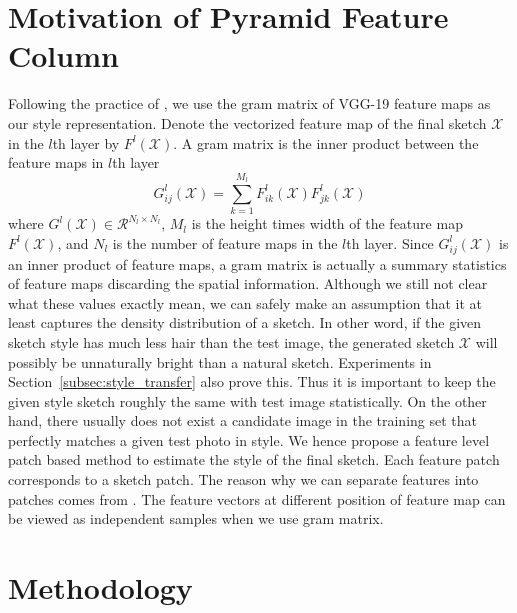 \documentclass[10pt,twocolumn,letterpaper]{article}
\begin{document}
\section{Motivation of Pyramid Feature Column}\label{sec:motivation}

Following the practice of \cite{gatys2015neural}, we use the gram matrix of VGG-19\cite{simonyan2014very} feature maps as our style representation. Denote the vectorized feature map of the final sketch $\mathcal{X}$ in the $l$th layer by $F^{l}(\mathcal{X})$. A gram matrix is the inner product between the feature maps in $l$th layer
\begin{equation}
G^l_{ij}(\mathcal{X}) = \sum \limits_{k=1}^{M_l} F^l_{ik}(\mathcal{X}) F^l_{jk}(\mathcal{X})
\label{eq:Gram_element}
\end{equation}
where $G^l(\mathcal{X}) \in {\mathcal{R}^{N_l \times N_l}}$, $M_l$ is the height times width of the feature map $F^{l}(\mathcal{X})$, and $N_l$ is the number of feature maps in the $l$th layer. Since $G^l_{ij}(\mathcal{X})$ is an inner product of feature maps, a gram matrix is actually a summary statistics of feature maps discarding the spatial information. Although we still not clear what these values exactly mean, we can safely make an assumption that it at least captures the density distribution of a sketch. In other word, if the given sketch style has much less hair than the test image, the generated sketch $\mathcal{X}$ will possibly be unnaturally bright than a natural sketch. Experiments in Section~\ref{subsec:style_transfer} also prove this. Thus it is important to keep the given style sketch roughly the same with test image statistically. On the other hand, there usually does not exist a candidate image in the training set that perfectly matches a given test photo in style. We hence propose a feature level patch based method to estimate the style of the final sketch. Each feature patch corresponds to a sketch patch. The reason why we can separate features into patches comes from \cite{Li2017Demistify}. The feature vectors at different position of feature map can be viewed as independent samples when we use gram matrix. 

\section{Methodology}
\end{document}
